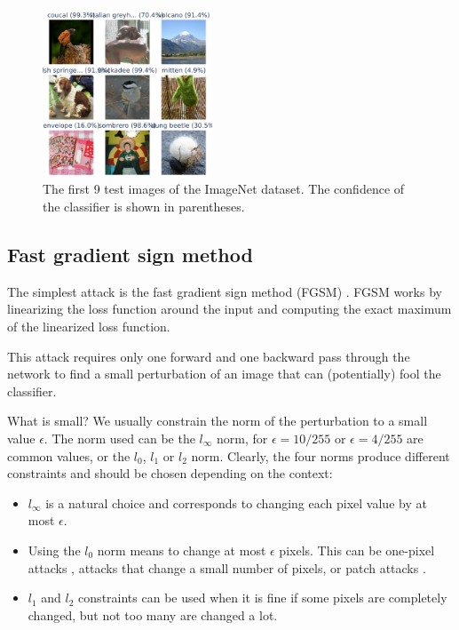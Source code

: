 \documentclass[]{scrarticle}
\begin{document}
\begin{figure}[h]
  \centering
  \includegraphics[width=0.45\textwidth]{../images/sample_ImageNet.png}
  \caption{The first 9 test images of the ImageNet dataset.
    The confidence of the classifier is shown in parentheses.}
  \label{fig:imagenet_samples}
\end{figure}


\subsection{Fast gradient sign method}
The simplest attack is the fast gradient sign method (FGSM) \cite{goodfellow2014explaining}.
FGSM works by linearizing the loss function around the input and
computing the exact maximum of the linearized loss function.

This attack requires only one forward and one backward pass through the network
to find a small perturbation of an image that can (potentially) fool the classifier.

What is small? We usually constrain the norm of the perturbation to
a small value $\epsilon$. The norm used can be the $l_\infty$ norm,
for $\epsilon = 10 / 255$ or $\epsilon = 4 / 255$ are common values,
or the $l_0$, $l_1$ or $l_2$ norm.
Clearly, the four norms produce different constraints and should be chosen
depending on the context:
\begin{itemize}
  \item $l_\infty$ is a natural choice and corresponds to changing each
    pixel value by at most $\epsilon$.
  \item Using the $l_0$ norm means to change at most $\epsilon$ pixels. This
    can be one-pixel attacks \cite{Su2017OnePA},
    attacks that change a small number of pixels,
    or patch attacks \cite{Brown2017AdversarialP}.
  \item $l_1$ and $l_2$ constraints can be used when it is fine if
    some pixels are completely changed, but not too many are changed
    a lot.
\end{itemize}
\end{document}
